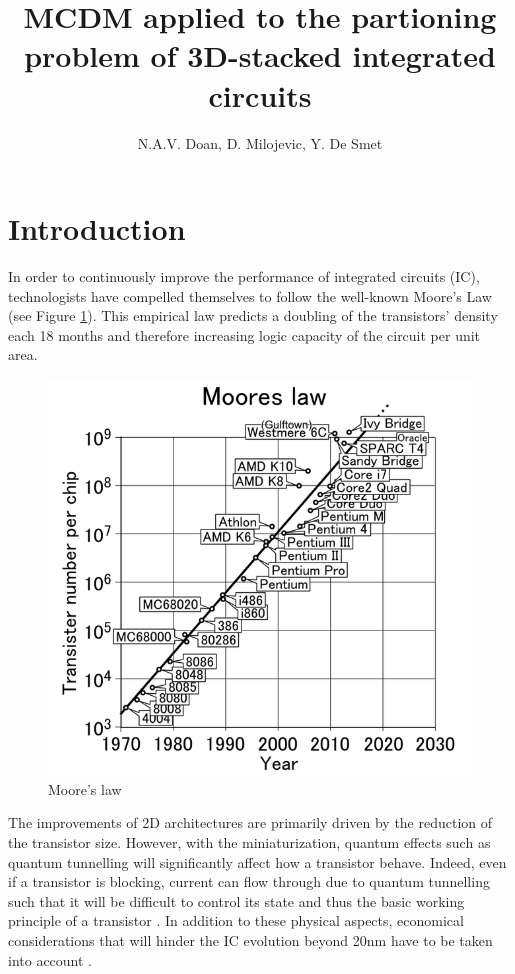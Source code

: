 \documentclass{svmult}
\begin{document}
\title*{MCDM applied to the partioning problem of 3D-stacked integrated circuits}
\author{N.A.V. Doan, D. Milojevic, Y. De Smet}

\maketitle

\section{Introduction}

In order to continuously improve the performance of integrated circuits (IC), technologists have compelled themselves to follow the well-known Moore's Law (see Figure \ref{fig:mooreslaw}). This empirical law predicts a doubling of the transistors' density each 18 months and therefore increasing logic capacity of the circuit per unit area.

\begin{figure}
\begin{center}
\includegraphics[width=0.7\linewidth]{mooreslaw.png}
\end{center}
\vspace{-0.5cm}
\caption{Moore's law \cite{mooreslawpic}}
\label{fig:mooreslaw}
\end{figure}

The improvements of 2D architectures are primarily driven by the reduction of the transistor size. However, with the miniaturization, quantum effects such as quantum tunnelling will significantly affect how a transistor behave. Indeed, even if a transistor is blocking, current can flow through due to quantum tunnelling such that it will be difficult to control its state and thus the basic working principle of a transistor \cite{1240081}. In addition to these physical aspects, economical considerations that will hinder the IC evolution beyond 20nm have to be taken into account \cite{5227192,PFF10}.
\end{document}
